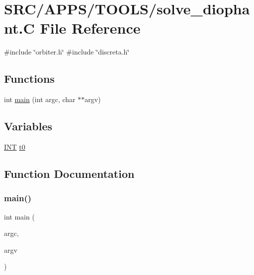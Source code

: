 \hypertarget{solve__diophant_8_c}{}\section{S\+R\+C/\+A\+P\+P\+S/\+T\+O\+O\+L\+S/solve\+\_\+diophant.C File Reference}
\label{solve__diophant_8_c}
{\ttfamily \#include \char`\"{}orbiter.\+h\char`\"{}}\newline
{\ttfamily \#include \char`\"{}discreta.\+h\char`\"{}}\newline
\subsection*{Functions}
\begin{DoxyCompactItemize}
\item 
int \mbox{\hyperlink{solve__diophant_8_c_a3c04138a5bfe5d72780bb7e82a18e627}{main}} (int argc, char $\ast$$\ast$argv)
\end{DoxyCompactItemize}
\subsection*{Variables}
\begin{DoxyCompactItemize}
\item 
\mbox{\hyperlink{galois_8h_a09fddde158a3a20bd2dcadb609de11dc}{I\+NT}} \mbox{\hyperlink{solve__diophant_8_c_a4268f4fe222ffb119218a0199f5e1904}{t0}}
\end{DoxyCompactItemize}


\subsection{Function Documentation}
\mbox{\label{solve__diophant_8_c_a3c04138a5bfe5d72780bb7e82a18e627}} 
\subsubsection{\texorpdfstring{main()}{main()}}
{\footnotesize\ttfamily int main (\begin{DoxyParamCaption}\item[{int}]{argc,  }\item[{char $\ast$$\ast$}]{argv }\end{DoxyParamCaption})}



